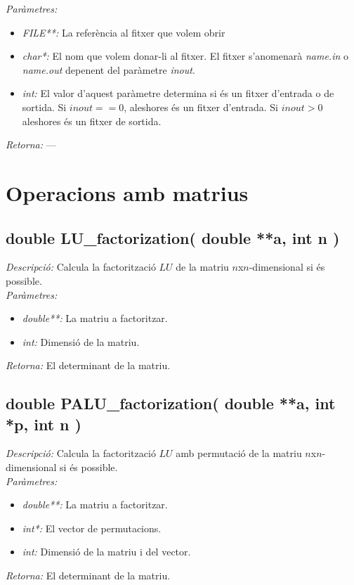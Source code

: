 \documentclass[a4paper,10pt, notitlepage]{article}
\begin{document}
\textit{Paràmetres: }\begin{itemize}[label={--}]
  \item \textit{FILE**: } La referència al fitxer que volem obrir
  \item \textit{char*: } El nom que volem donar-li al fitxer. El fitxer s'anomenarà \textit{name.in} o \textit{name.out} depenent del paràmetre \textit{inout}.
  \item \textit{int: } El valor d'aquest paràmetre determina si és un fitxer d'entrada o de sortida. Si $inout==0$, aleshores és un fitxer d'entrada. Si $inout>0$ aleshores és un fitxer de sortida.
\end{itemize}
\textit{Retorna: } ---



\section{Operacions amb matrius}
\subsection{double LU\_factorization( double **a, int n )}
\textit{Descripció: }
  Calcula la factorització $LU$ de la matriu $n$x$n$-dimensional si és possible.
\\\textit{Paràmetres: }\begin{itemize}[label={--}]
  \item \textit{double**: } La matriu a factoritzar.
  \item \textit{int: } Dimensió de la matriu.
\end{itemize}
\textit{Retorna: } El determinant de la matriu.



\subsection{double PALU\_factorization( double **a, int *p, int n )}
\textit{Descripció: }
  Calcula la factorització $LU$ amb permutació de la matriu $n$x$n$-dimensional si és possible.
\\\textit{Paràmetres: }\begin{itemize}[label={--}]
  \item \textit{double**: } La matriu a factoritzar.
  \item \textit{int*: } El vector de permutacions.
  \item \textit{int: } Dimensió de la matriu i del vector.
\end{itemize}
\textit{Retorna: } El determinant de la matriu.
\end{document}
